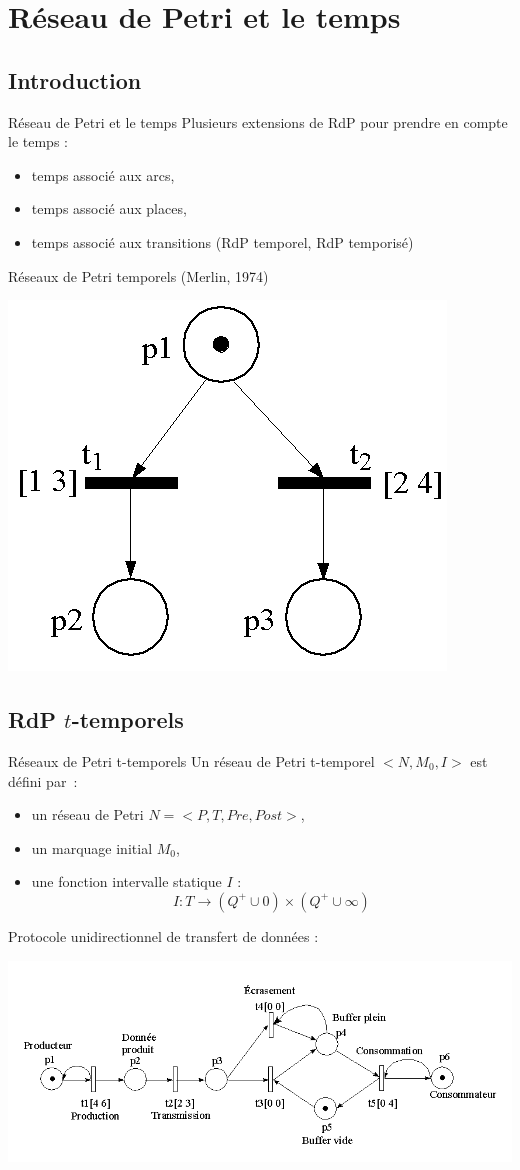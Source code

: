 \documentclass[compress]{beamer}
\begin{document}
\section{Réseau de Petri et le temps}\subsection{Introduction}
\begin{frame}{Réseau de Petri et le temps}
Plusieurs extensions de RdP pour prendre en compte le temps :
\begin{itemize}
\item temps associé aux arcs,
\item temps associé aux places,
\item temps associé aux transitions (RdP temporel, RdP temporisé)
\end{itemize}
\begin{block}{Réseaux de Petri temporels (Merlin, 1974)}
	\begin{center}
	\includegraphics[width=.3\linewidth]{rdp_s_forte}
	\end{center}
\end{block}
\end{frame}
 
\subsection{RdP $t$-temporels}
\begin{frame}{Réseaux de Petri t-temporels}
Un réseau de Petri t-temporel $<N, M_0, I>$ est défini par~:
\begin{itemize}
\item un réseau de Petri \mbox{$N = <P,T,Pre, Post>$},
\item un marquage initial $M_0$,
\item une fonction intervalle statique $I$ :
	$$I: T \rightarrow (Q^+ \cup 0) \times (Q^+ \cup \infty)$$
\end{itemize}
\vspace{.2cm}
Protocole unidirectionnel de transfert de données :
\begin{center}
\includegraphics[width=.8\linewidth]{rdp_exo}
\end{center}
\end{frame}
\end{document}
